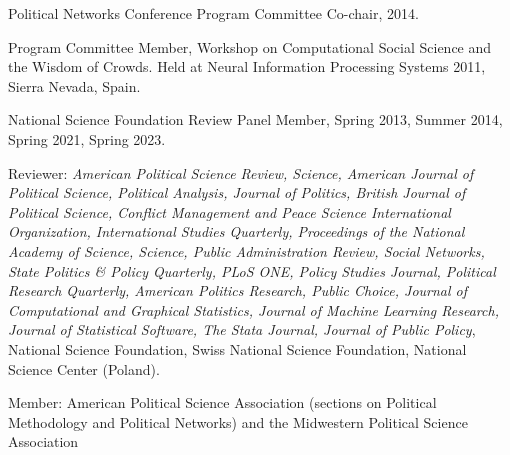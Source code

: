 \documentclass[overlapped,line]{res}
\begin{document}
\begin{resume}
\begin{etaremune}
\item Political Networks Conference Program Committee Co-chair, 2014.
\item Program Committee Member, Workshop on Computational Social Science and the Wisdom of Crowds. Held at Neural Information Processing Systems 2011, Sierra Nevada, Spain.
\item National Science Foundation Review Panel Member, Spring 2013, Summer 2014, Spring 2021, Spring 2023.
\item Reviewer: {\em American Political Science Review, Science, American Journal of Political Science, Political Analysis, Journal of Politics, British Journal of Political Science, Conflict Management and Peace Science International Organization, International Studies Quarterly, Proceedings of the National Academy of Science,  Science,  Public Administration Review, Social Networks, State Politics \& Policy Quarterly, PLoS ONE, Policy Studies Journal, Political Research Quarterly, American Politics Research, Public Choice, Journal of Computational and Graphical Statistics, Journal of Machine Learning Research, Journal of Statistical Software, The Stata Journal, Journal of Public Policy}, National Science Foundation, Swiss National Science Foundation, National Science Center (Poland).
\item Member: American Political Science Association (sections on Political Methodology and Political Networks) and the Midwestern Political Science Association
\end{etaremune}











\end{resume}
\end{document}

